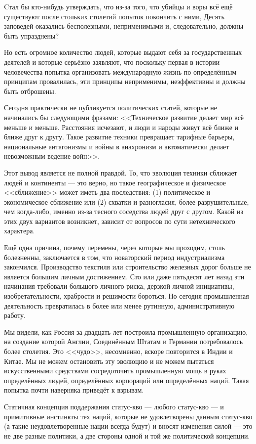 Cтал бы кто-нибудь утверждать, что из-за того, что убийцы и воры всё ещё существуют после стольких столетий попыток покончить с ними, Десять заповедей оказались бесполезными, неприменимыми и, следовательно, должны быть упразднены?

Но есть огромное количество людей, которые выдают себя за государственных деятелей и которые серьёзно заявляют, что поскольку первая в истории человечества попытка организовать международную жизнь по определённым принципам провалилась, эти принципы неприменимы, неэффективны и должны быть отброшены.

Сегодня практически не публикуется политических статей, которые не начинались бы следующими фразами: <<Техническое развитие делает мир всё меньше и меньше. Расстояния исчезают, и люди и народы живут всё ближе и ближе друг к другу. Такое развитие техники превращает тарифные барьеры, национальные антагонизмы и войны в анахронизм и автоматически делает невозможным ведение войн>>.

Этот вывод является не полной правдой. То, что эволюция техники сближает людей и континенты — это верно, но такое географическое и физическое <<сближение>> может иметь два последствия: (1) политическое и экономическое сближение или (2) схватки и разногласия, более разрушительные, чем когда-либо, именно из-за тесного соседства людей друг с другом. Какой из этих двух вариантов возникнет, зависит от вопросов по сути нетехнического характера.

Ещё одна причина, почему перемены, через которые мы проходим, столь болезненны, заключается в том, что новаторский период индустриализма закончился. Производство текстиля или строительство железных дорог больше не является большим личным достижением. Сто или даже пятьдесят лет назад эти начинания требовали большого личного риска, дерзкой личной инициативы, изобретательности, храбрости и решимости бороться. Но сегодня промышленная деятельность превратилась в более или менее рутинную, административную работу.

Мы видели, как Россия за двадцать лет построила промышленную организацию, на создание которой Англии, Соединённым Штатам и Германии потребовалось более столетия. Это <<чудо>>, несомненно, вскоре повторится в Индии и Китае. Мы не можем остановить эту эволюцию и не можем пытаться искусственными средствами сосредоточить промышленную мощь в руках определённых людей, определённых корпораций или определённых наций. Такая попытка почти наверняка приведёт к взрывам.

Статичная концепция поддержания статус-кво — любого статус-кво — и примитивные инстинкты тех наций, которые не удовлетворены данным статус-кво (а такие неудовлетворенные нации всегда будут) и вносят изменения силой — это не две разные политики, а две стороны одной и той же политической концепции.

